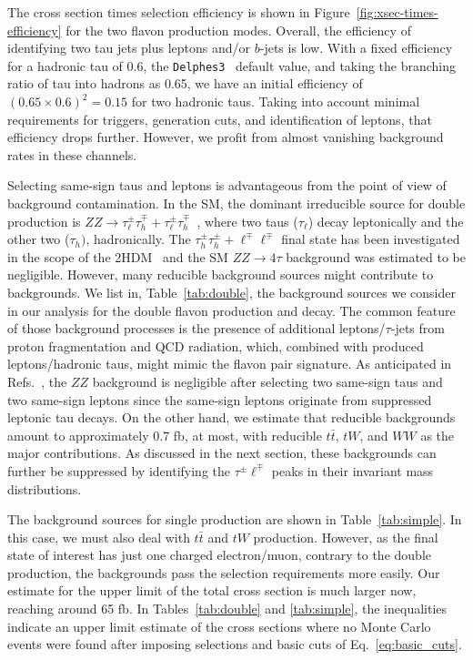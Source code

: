 \documentclass[prd,amsfonts,onecolumn,superscriptaddress,aps,nofootinbib,11pt]{revtex4-1}
\begin{document}
 The cross section times selection efficiency is shown in Figure~\ref{fig:xsec-times-efficiency} for the two flavon production modes. Overall, the efficiency of identifying two tau jets plus leptons and/or $b$-jets is low. With a fixed efficiency for a hadronic tau of 0.6, the \texttt{Delphes3}~\cite{deFavereau:2013fsa} default value, and taking the branching ratio of tau into hadrons as 0.65, we have an initial efficiency of $(0.65\times 0.6)^2=0.15$ for two hadronic taus. Taking into account minimal requirements for triggers, generation cuts, and identification of leptons, that efficiency drops further. However, we profit from almost vanishing background rates in these channels.

 Selecting same-sign taus and leptons is advantageous from the point of view of background contamination. In the SM, the dominant irreducible source for double production is $ZZ\to \tau_\ell^\pm\tau_h^\mp+\tau_\ell^\pm\tau_h^\mp$~, where two taus ($\tau_\ell$) decay leptonically and the other two ($\tau_h)$, hadronically.   The $\tau_h^\pm\tau_h^\pm+\ell^\mp\ell^\mp$ final state has been investigated in the scope of the 2HDM~\cite{Iguro:2019sly,Blanke:2022kpi} and the SM $ZZ\to 4\tau$ background was estimated to be negligible. However, many reducible background sources might contribute to backgrounds. We list in, Table~\ref{tab:double}, the background sources we consider in our analysis for the double flavon production and decay. The common feature of those background processes is the presence of additional leptons/$\tau$-jets from proton fragmentation and QCD radiation, which, combined with produced leptons/hadronic taus, might mimic the flavon pair signature. As anticipated in Refs.~\cite{Iguro:2019sly,Blanke:2022kpi}, the $ZZ$ background is negligible after selecting two same-sign taus and two same-sign leptons since the same-sign leptons originate from suppressed leptonic tau decays. On the other hand, we estimate that reducible backgrounds amount to approximately 0.7 fb, at most, with reducible $t\bar{t}$, $tW$, and $WW$ as the major contributions. As discussed in the next section, these backgrounds can further be suppressed by identifying the $\tau^\pm\ell^\mp$ peaks in their invariant mass distributions.

The background sources for single production are shown in Table~\ref{tab:simple}. In this case, we must also deal with $t\bar{t}$ and $tW$ production. However, as the final state of interest has just one charged electron/muon, contrary to the double production, the backgrounds pass the selection requirements more easily. Our estimate for the upper limit of the total cross section is much larger now, reaching around 65 fb. In Tables~\ref{tab:double} and \ref{tab:simple}, the inequalities indicate an upper limit estimate of the cross sections where no Monte Carlo events were found after imposing selections and basic cuts of Eq.~\eqref{eq:basic_cuts}.
\end{document}

